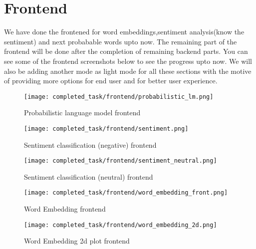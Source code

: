 \chapter{Frontend}
We have done the frontened for word embeddings,sentiment analysis(know the sentiment) and next probabable words upto now. The remaining part of the frontend will be done after the completion of remaining backend parts. You can see some of the frontend screenshots below to see the progress upto now. We will also be adding another mode as light mode for all these sections with the motive of providing more options for end user and for better user experience.


\begin{figure}[H]
	\centering
	\texttt{[image: completed\_task/frontend/probabilistic\_lm.png]}
	\caption{Probabilistic language model frontend}
	\label{fig:Probabilistic language model frontend}
\end{figure}

\begin{figure}[H]
	\centering
	\texttt{[image: completed\_task/frontend/sentiment.png]}
	\caption{Sentiment classification (negative) frontend}
	\label{fig:Sentiment classification  (negative) frontend}
\end{figure}

\begin{figure}[H]
	\centering
	\texttt{[image: completed\_task/frontend/sentiment\_neutral.png]}
	\caption{Sentiment classification (neutral) frontend}
	\label{fig:Sentiment classification (neutral) frontend}
\end{figure}

\begin{figure}[H]
	\centering
	\texttt{[image: completed\_task/frontend/word\_embedding\_front.png]}
	\caption{Word Embedding frontend}
	\label{fig:Word Embedding frontend}
\end{figure}

\begin{figure}[H]
	\centering
	\texttt{[image: completed\_task/frontend/word\_embedding\_2d.png]}
	\caption{Word Embedding 2d plot frontend}
	\label{fig:Word Embedding 2d plot frontend}
\end{figure}